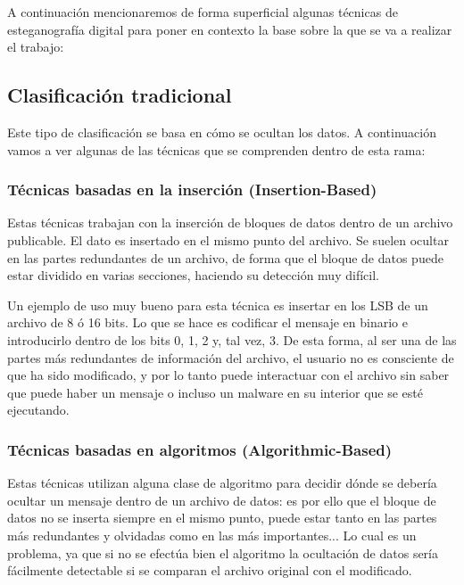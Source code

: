 A continuación mencionaremos de forma superficial algunas técnicas  de esteganografía digital para poner en contexto la base sobre la que se va a realizar el trabajo:

\subsection{Clasificación tradicional}
\label{sec:trad}

Este tipo de clasificación se basa en cómo se ocultan los datos. A continuación vamos a ver algunas de las técnicas que se comprenden dentro de esta rama:

\subsubsection{Técnicas basadas en la inserción (Insertion-Based)}

Estas técnicas trabajan con la inserción de bloques de datos dentro de un archivo publicable. El dato es insertado en el mismo punto del archivo. Se suelen ocultar en las partes redundantes de un archivo, de forma que el bloque de datos puede estar dividido en varias secciones, haciendo su detección muy difícil.%

Un ejemplo de uso muy bueno para esta técnica es insertar en los \ac{LSB} de un archivo de 8 ó 16 bits. Lo que se hace es codificar el mensaje en binario e introducirlo dentro de los bits 0, 1, 2 y, tal vez, 3. De esta forma, al ser una de las partes más redundantes de información del archivo, el usuario no es consciente de que ha sido modificado, y por lo tanto puede interactuar con el archivo sin saber que puede haber un mensaje o incluso un malware en su interior que se esté ejecutando.

\subsubsection{Técnicas basadas en algoritmos (Algorithmic-Based)} 

Estas técnicas utilizan alguna clase de algoritmo para decidir dónde se debería ocultar un mensaje dentro de un archivo de datos: es por ello que el bloque de datos no se inserta siempre en el mismo punto, puede estar tanto en las partes más redundantes y olvidadas como en las más importantes... Lo cual es un problema, ya que si no se efectúa bien el algoritmo la ocultación de datos sería fácilmente detectable si se comparan el archivo original con el modificado. %

